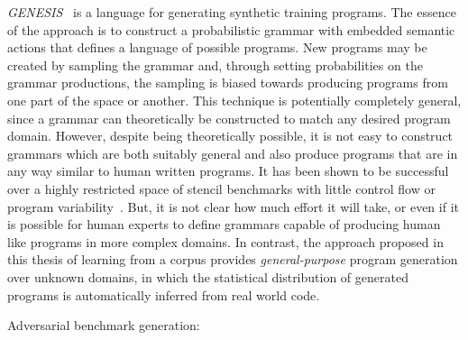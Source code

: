 \emph{GENESIS}~\cite{Chiu2015} is a language for generating synthetic training programs. The essence of the approach is to construct a probabilistic grammar with embedded semantic actions that defines a language of possible programs. New programs may be created by sampling the grammar and, through setting probabilities on the grammar productions, the sampling is biased towards producing programs from one part of the space or another. This technique is potentially completely general, since a grammar can theoretically be constructed to match any desired program domain. However, despite being theoretically possible, it is not easy to construct grammars which are both suitably general and also produce programs that are in any way similar to human written programs. It has been shown to be successful over a highly restricted space of stencil benchmarks with little control flow or program variability~\cite{Garvey2015b,Falch2015,Cummins2015}. But, it is not clear how much effort it will take, or even if it is possible for human experts to define grammars capable of producing human like programs in more complex domains. In contrast, the approach proposed in this thesis of learning from a corpus provides \emph{general-purpose} program generation over unknown domains, in which the statistical distribution of generated programs is automatically inferred from real world code.

Adversarial benchmark generation:




